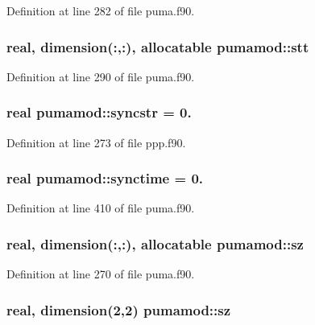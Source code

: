 \-Definition at line 282 of file puma.\-f90.

\hypertarget{classpumamod_a38a8cfb3cd3b1ccf0fd5b7283e0949be}{
\subsubsection[{stt}]{\setlength{\rightskip}{0pt plus 5cm}real, dimension(\-:,\-:), allocatable {\bf pumamod\-::stt}}}
\label{classpumamod_a38a8cfb3cd3b1ccf0fd5b7283e0949be}


\-Definition at line 290 of file puma.\-f90.

\hypertarget{classpumamod_a3584bf754ed1ce4f81f9ae5c2d909c55}{
\subsubsection[{syncstr}]{\setlength{\rightskip}{0pt plus 5cm}real {\bf pumamod\-::syncstr} = 0.}}
\label{classpumamod_a3584bf754ed1ce4f81f9ae5c2d909c55}


\-Definition at line 273 of file ppp.\-f90.

\hypertarget{classpumamod_a24c3f399235c4ea5f2d8e1f867f8776d}{
\subsubsection[{synctime}]{\setlength{\rightskip}{0pt plus 5cm}real {\bf pumamod\-::synctime} = 0.}}
\label{classpumamod_a24c3f399235c4ea5f2d8e1f867f8776d}


\-Definition at line 410 of file puma.\-f90.

\hypertarget{classpumamod_a6da929d3d47a0b47afc30657bf43cb74}{
\subsubsection[{sz}]{\setlength{\rightskip}{0pt plus 5cm}real, dimension(\-:,\-:), allocatable {\bf pumamod\-::sz}}}
\label{classpumamod_a6da929d3d47a0b47afc30657bf43cb74}


\-Definition at line 270 of file puma.\-f90.

\hypertarget{classpumamod_acdc2f913a6792772fcb9a2ebf1b0b043}{
\subsubsection[{sz}]{\setlength{\rightskip}{0pt plus 5cm}real, dimension(2,2) {\bf pumamod\-::sz}}}
\label{classpumamod_acdc2f913a6792772fcb9a2ebf1b0b043}



